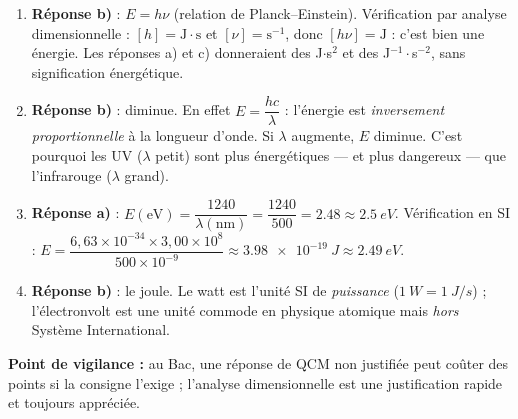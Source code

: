 \documentclass[11pt]{article}
\begin{document}
\begin{corrige}
\begin{enumerate}
\item \textbf{Réponse b)} : $E = h\nu$ (relation de Planck--Einstein). Vérification par analyse dimensionnelle : $[h] = \text{J}\cdot\text{s}$ et $[\nu] = \text{s}^{-1}$, donc $[h\nu] = \text{J}$ : c'est bien une énergie. Les réponses a) et c) donneraient des J$\cdot$s$^2$ et des J$^{-1}\cdot$s$^{-2}$, sans signification énergétique.
\item \textbf{Réponse b)} : diminue. En effet $E = \dfrac{hc}{\lambda}$ : l'énergie est \emph{inversement proportionnelle} à la longueur d'onde. Si $\lambda$ augmente, $E$ diminue. C'est pourquoi les UV ($\lambda$ petit) sont plus énergétiques — et plus dangereux — que l'infrarouge ($\lambda$ grand).
\item \textbf{Réponse a)} : $E(\text{eV}) = \dfrac{1240}{\lambda(\text{nm})} = \dfrac{1240}{500} = \num{2,48} \approx \SI{2,5}{eV}$. Vérification en SI : $E = \dfrac{6,63\times 10^{-34}\times 3,00\times 10^{8}}{500\times 10^{-9}} \approx \SI{3,98e-19}{J} \approx \SI{2,49}{eV}$.
\item \textbf{Réponse b)} : le joule. Le watt est l'unité SI de \emph{puissance} ($\SI{1}{W} = \SI{1}{J/s}$) ; l'électronvolt est une unité commode en physique atomique mais \emph{hors} Système International.
\end{enumerate}
\textbf{Point de vigilance :} au Bac, une réponse de QCM non justifiée peut coûter des points si la consigne l'exige ; l'analyse dimensionnelle est une justification rapide et toujours appréciée.
\end{corrige}
\end{document}

